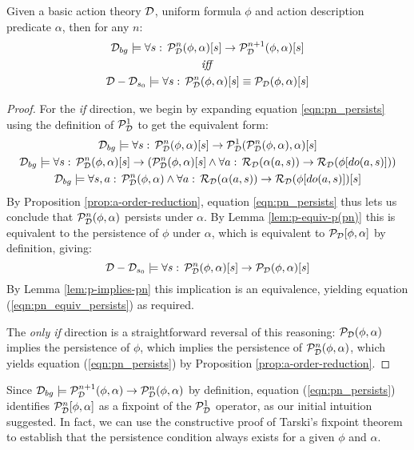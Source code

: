 \begin{thm}
Given a basic action theory $\mathcal{D}$, uniform formula $\phi$
and action description predicate $\alpha$, then for any $n$:\label{thm:p(pn)-equiv-p}\begin{gather}
\mathcal{D}_{bg}\models\forall s:\,\mathcal{P}_{\mathcal{D}}^{n}(\phi,\alpha)[s]\rightarrow\mathcal{P}_{\mathcal{D}}^{n+1}(\phi,\alpha)[s]\label{eqn:pn_persists}\\
\mathit{iff}\nonumber \\
\mathcal{D}-\mathcal{D}_{s_{0}}\models\forall s:\,\mathcal{P}_{\mathcal{D}}^{n}(\phi,\alpha)[s]\equiv\mathcal{P}_{\mathcal{D}}(\phi,\alpha)[s]\label{eqn:pn_equiv_persists}\end{gather}

\end{thm}
\begin{proof}
For the \emph{if} direction, we begin by expanding equation \eqref{eqn:pn_persists}
using the definition of $\mathcal{P}_{\mathcal{D}}^{1}$ to get the
equivalent form:\begin{gather*}
\mathcal{D}_{bg}\models\forall s:\,\mathcal{P}_{\mathcal{D}}^{n}(\phi,\alpha)[s]\rightarrow\mathcal{P}_{\mathcal{D}}^{1}(\mathcal{P}_{\mathcal{D}}^{n}(\phi,\alpha),\alpha)[s]\\
\mathcal{D}_{bg}\models\forall s:\,\mathcal{P}_{\mathcal{D}}^{n}(\phi,\alpha)[s]\rightarrow\left(\mathcal{P}_{\mathcal{D}}^{n}(\phi,\alpha)[s]\wedge\forall a:\,\mathcal{R}_{\mathcal{D}}(\alpha(a,s))\rightarrow\mathcal{R}_{\mathcal{D}}(\phi[do(a,s)])\right)\\
\mathcal{D}_{bg}\models\forall s,a:\,\mathcal{P}_{\mathcal{D}}^{n}(\phi,\alpha)\wedge\forall a:\,\mathcal{R}_{\mathcal{D}}(\alpha(a,s))\rightarrow\mathcal{R}_{\mathcal{D}}(\phi[do(a,s)])[s]\end{gather*}
 By Proposition \ref{prop:a-order-reduction}, equation \eqref{eqn:pn_persists}
thus lets us conclude that $\mathcal{P}_{\mathcal{D}}^{n}(\phi,\alpha)$
persists under $\alpha$. By Lemma \ref{lem:p-equiv-p(pn)} this is
equivalent to the persistence of $\phi$ under $\alpha$, which is
equivalent to $\mathcal{P}_{\mathcal{D}}[\phi,\alpha]$ by definition, giving:\[
\mathcal{D}-\mathcal{D}_{s_{0}}\models\forall s:\,\mathcal{P}_{\mathcal{D}}^{n}(\phi,\alpha)[s]\rightarrow\mathcal{P}_{\mathcal{D}}(\phi,\alpha)[s]\]
 By Lemma \ref{lem:p-implies-pn} this implication is an equivalence,
yielding equation (\ref{eqn:pn_equiv_persists}) as required.

The \emph{only if} direction is a straightforward reversal of this
reasoning: $\mathcal{P}_{\mathcal{D}}(\phi,\alpha)$ implies the persistence
of $\phi$, which implies the persistence of $\mathcal{P}_{\mathcal{D}}^{n}(\phi,\alpha)$,
which yields equation (\ref{eqn:pn_persists}) by Proposition \ref{prop:a-order-reduction}. 
\end{proof}
Since $\mathcal{D}_{bg}\models\mathcal{P}_{\mathcal{D}}^{n+1}(\phi,\alpha)\rightarrow\mathcal{P}_{\mathcal{D}}^{n}(\phi,\alpha)$
by definition, equation (\ref{eqn:pn_persists}) identifies $\mathcal{P}_{\mathcal{D}}^{n}[\phi,\alpha]$
as a fixpoint of the $\mathcal{P}_{\mathcal{D}}^{1}$ operator, as
our initial intuition suggested. In fact, we can use the constructive
proof of Tarski's fixpoint theorem \citep{cousot79constructive_tarski}
to establish that the persistence condition always exists for a given
$\phi$ and $\alpha$.

